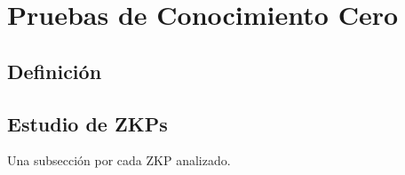 \chapter{Pruebas de Conocimiento Cero}\label{ch:zkp} 


\section{Definición}

\section{Estudio de ZKPs}

Una subsección por cada ZKP analizado.